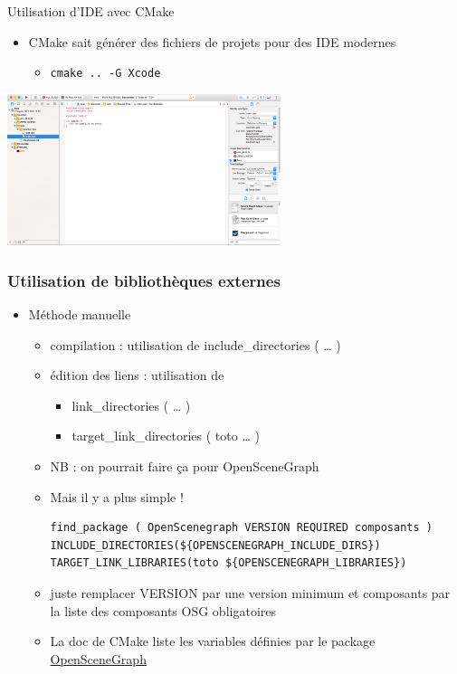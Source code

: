 \begin{frame}{Utilisation d'IDE avec CMake}
\begin{itemize}
\item CMake sait générer des fichiers de projets pour des IDE modernes
\begin{itemize}
\item \texttt{cmake .. -G Xcode}
\end{itemize}
\end{itemize}
\begin{center}
\includegraphics[width=8cm]{fig/cmake-xcode.png}
\end{center}
\end{frame}

\begin{frame}[fragile]\frametitle{Utilisation de bibliothèques externes}

\begin{itemize}
\itemsep1pt\parskip0pt
\item
  Méthode manuelle

  \begin{itemize}
  \itemsep1pt\parskip0pt
  \item
    compilation : utilisation de include\_directories ( \ldots{} )
  \item
    édition des liens : utilisation de

    \begin{itemize}
    \itemsep1pt\parskip0pt
    \item
      link\_directories ( \ldots{} )
    \item
      target\_link\_directories ( toto \ldots{} )
    \end{itemize}
  \item
    NB : on pourrait faire ça pour OpenSceneGraph
  \item
    Mais il y a plus simple !
\begin{verbatim}
find_package ( OpenScenegraph VERSION REQUIRED composants )
INCLUDE_DIRECTORIES(${OPENSCENEGRAPH_INCLUDE_DIRS})
TARGET_LINK_LIBRARIES(toto ${OPENSCENEGRAPH_LIBRARIES})
\end{verbatim}
\item juste remplacer VERSION par une version minimum et composants par la liste des composants OSG obligatoires
\item La doc de CMake liste les variables définies par le package \href{http://www.cmake.org/cmake/help/v3.0/module/FindOpenSceneGraph.html}{OpenSceneGraph}
  \end{itemize}
\end{itemize}

\end{frame}

